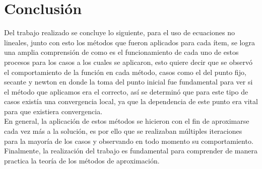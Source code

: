 \documentclass{udpreport}
\begin{document}
    \chapter{Conclusión}
      Del trabajo realizado se concluye lo siguiente, para el uso de ecuaciones no lineales, junto con esto los métodos que fueron aplicados para cada ítem, se logra  una amplia comprensión de como es el funcionamiento de cada uno de estos procesos para los casos a los cuales se aplicaron, esto quiere decir que se observó el comportamiento de la función en cada método, casos como el del punto fijo, secante y newton en donde la toma del punto inicial fue fundamental para ver si el método que aplicamos era el correcto, así se determinó que para este tipo de casos existía una convergencia local, ya que la dependencia de este punto era vital para que existiera convergencia. 
\\
En general, la aplicación de estos métodos se hicieron con el fin de aproximarse cada vez más a la solución, es por ello que se realizaban múltiples iteraciones para la mayoría de los casos y observando en todo momento su comportamiento. Finalmente, la realización del trabajo es fundamental para comprender de manera practica la teoría de los métodos de aproximación. 
\end{document}
